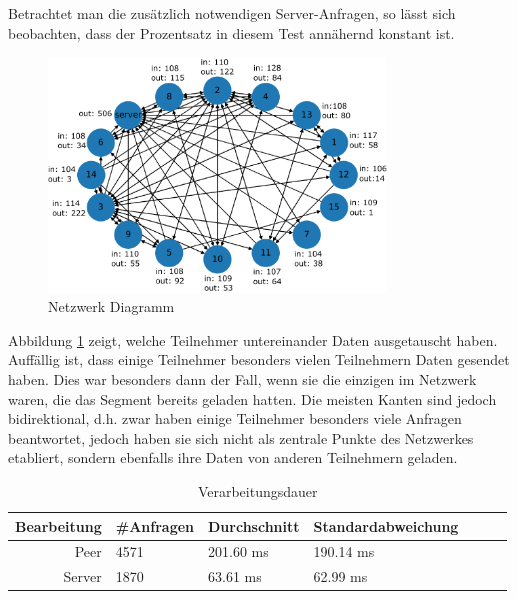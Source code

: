 Betrachtet man die zusätzlich notwendigen Server-Anfragen, so lässt sich beobachten, dass der Prozentsatz in diesem Test annähernd konstant ist.  


\begin{figure}[!h]
	\centering
	\includegraphics[width=0.8\textwidth]{figures/15_clients_network}
	\caption[Netzwerk Diagramm]{Netzwerk Diagramm}
	\label{fig:15_clients_network}
\end{figure}

Abbildung \ref{fig:15_clients_network} zeigt, welche Teilnehmer untereinander Daten ausgetauscht haben. Auffällig ist, dass einige Teilnehmer besonders vielen Teilnehmern Daten gesendet haben. Dies war besonders dann der Fall, wenn sie die einzigen im Netzwerk waren, die das Segment bereits geladen hatten. Die meisten Kanten sind jedoch bidirektional, d.h. zwar haben einige Teilnehmer besonders viele Anfragen beantwortet, jedoch haben sie sich nicht als zentrale Punkte des Netzwerkes etabliert, sondern ebenfalls ihre Daten von anderen Teilnehmern geladen.

\begin{table}[!htb]
\begin{center}

	\begin{tabular}{|r|l|l|l|l|l|l|}
		\hline
		Bearbeitung	 & \#Anfragen 	& Durchschnitt 	& Standardabweichung \\ \hline %
		Peer 		& 4571 				& 201.60	 ms	  	& 190.14	 ms	\\ \hline %
		Server 		& 1870		 		& 63.61 ms		& 62.99	ms	\\ %
		\hline
	\end{tabular}
	\caption{Verarbeitungsdauer}
\end{center}

\end{table}

